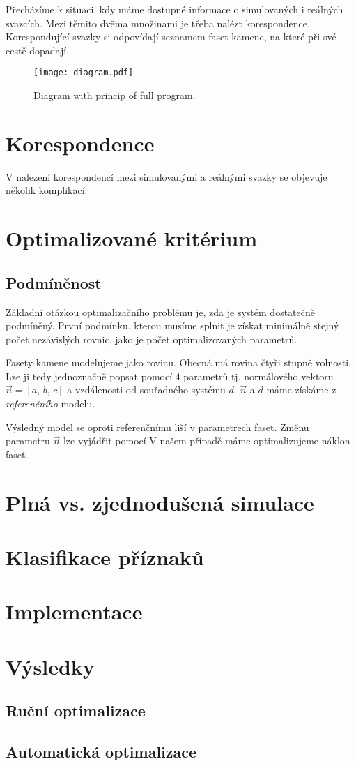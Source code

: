 Přecházíme k situaci, kdy máme dostupné informace o simulovaných i reálných svazcích. Mezi těmito dvěma množinami je třeba nalézt korespondence. Korespondující svazky si odpovídají seznamem faset kamene, na které při své cestě dopadají.  


\begin{figure}
\centering
\texttt{[image: diagram.pdf]}
\caption{Diagram with princip of full program.}
\label{fig:diagram}
\end{figure}


\section{Korespondence}
V nalezení korespondencí mezi simulovanými a reálnými svazky se objevuje několik komplikací. 

\section{Optimalizované kritérium}

\subsection{Podmíněnost}
Základní otázkou optimalizačního problému je, zda je systém dostatečně podmíněný. První podmínku, kterou musíme splnit je získat minimálně stejný počet nezávislých rovnic, jako je počet optimalizovaných parametrů. 

Fasety kamene modelujeme jako rovinu. Obecná má rovina čtyři stupně volnosti. Lze ji tedy jednoznačně popsat pomocí 4 parametrů tj. normálového vektoru $\vec{n} = \left[a,\,b,\,c\right]$ a vzdálenosti od souřadného systému $d$. $\vec{n}$ a $d$ máme získáme z \textit{referenčního} modelu. 

Výsledný model se oproti referenčnímu liší v parametrech faset. Změnu parametru $\vec{n}$ lze vyjádřit pomocí 
V našem případě máme optimalizujeme náklon faset.   

\section{Plná vs. zjednodušená simulace}

\section{Klasifikace příznaků}

\section{Implementace}

\section{Výsledky}

\subsection{Ruční optimalizace}

\subsection{Automatická optimalizace}

 \clearpage